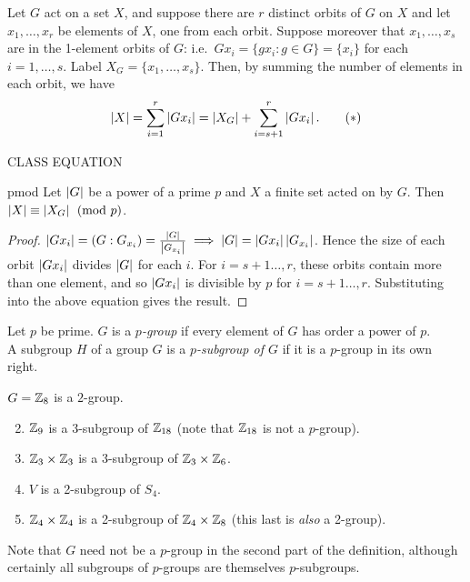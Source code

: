 Let $G$ act on a set $X$, and suppose there are $r$ distinct orbits of $G$ on $X$ and let $x_1,\ldots,x_r$ be elements of $X$, one from each orbit. Suppose moreover that $x_1,\ldots,x_s$ are in the 1-element orbits of $G$: i.e.~$Gx_i=\{gx_i:g\in G\}=\{x_i\}$ for each $i=1,\ldots,s$. Label $X_G=\{x_1,\ldots,x_s\}$. Then, by summing the number of elements in each orbit, we have
\[\left| X\right|=\sum_{i=1}^r\left| Gx_i\right|=\left| X_G\right|+\sum_{i=s+1}^r\left| Gx_i\right|.\tag*{($\ast$)}\]

CLASS EQUATION

\begin{thm}{}{pmod}
Let $\left| G\right|$ be a power of a prime $p$ and $X$ a finite set acted on by $G$. Then $\left| X\right|\equiv\left| X_G\right|\pmod p$.
\end{thm}

\begin{proof}
$\left| Gx_i\right|=(G:G_{x_i})=\frac{\left| G\right|}{\left| G_{x_i}\right|}\implies \left| G\right|=\left| Gx_i\right|\left| G_{x_i}\right|$. Hence the size of each orbit $\left| Gx_i\right|$ divides $\left| G\right|$ for each $i$. For $i=s+1\ldots,r$, these orbits contain more than one element, and so $\left| Gx_i\right|$ is divisible by $p$ for $i=s+1\ldots,r$. Substituting into the above equation gives the result.
\end{proof}

\begin{defn}{}{}
Let $p$ be prime. $G$ is a \emph{$p$-group} if every element of $G$ has order a power of $p$.\\
A subgroup $H$ of a group $G$ is a \emph{$p$-subgroup of $G$} if it is a $p$-group in its own right.
\end{defn}

\begin{examples}{}{}
\exstart $G=\mathbb{Z}_8$ is a $2$-group.
\begin{enumerate}\setcounter{enumi}{1}
\item $\mathbb{Z}_9$ is a 3-subgroup of $\mathbb{Z}_{18}$ (note that $\mathbb{Z}_{18}$ is not a $p$-group).
\item $\mathbb{Z}_3\times\mathbb{Z}_3$ is a 3-subgroup of $\mathbb{Z}_3\times\mathbb{Z}_6$.
\item $V$ is a 2-subgroup of $S_4$.
\item $\mathbb{Z}_4\times\mathbb{Z}_4$ is a 2-subgroup of $\mathbb{Z}_4\times\mathbb{Z}_8$ (this last is \emph{also} a 2-group).
\end{enumerate}
\end{examples}

Note that $G$ need not be a $p$-group in the second part of the definition, although certainly all subgroups of $p$-groups are themselves $p$-subgroups.


